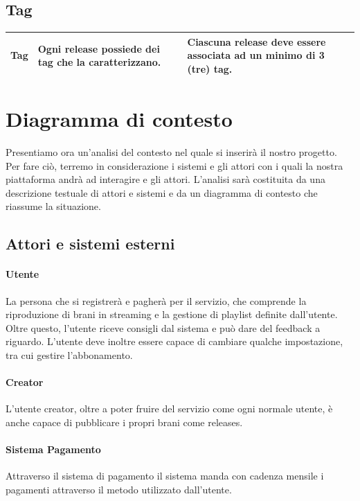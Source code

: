 \documentclass[a4paper,12pt]{article}
\begin{document}
\subsection*{Tag}

{
    \centering
    \begin{tabularx}{\textwidth}{|l|>{\raggedright\arraybackslash}X|>{\raggedright\arraybackslash}X|>{\raggedright\arraybackslash}X|}
    \hline
    Tag & Ogni release possiede dei tag che la caratterizzano. & Ciascuna release deve essere associata ad un minimo di 3 (tre) tag. \\
    \hline
    \end{tabularx} \par
}

\newpage
\section{Diagramma di contesto}

Presentiamo ora un'analisi del contesto nel quale si inserirà il nostro progetto. Per fare ciò, terremo in considerazione i sistemi e gli attori con i quali la nostra piattaforma andrà ad interagire e gli attori. L'analisi sarà costituita da una descrizione testuale di attori e sistemi e da un diagramma di contesto che riassume la situazione.

\subsection{Attori e sistemi esterni}

\paragraph{Utente} La persona che si registrerà e pagherà per il servizio, che comprende la riproduzione di brani in streaming e la gestione di playlist definite dall’utente. Oltre questo, l’utente riceve consigli dal sistema e può dare del feedback a riguardo. L’utente deve inoltre essere capace di cambiare qualche impostazione, tra cui gestire l’abbonamento.

\paragraph{Creator} L’utente creator, oltre a poter fruire del servizio come ogni normale utente, è anche capace di pubblicare i propri brani come releases.

\paragraph{Sistema Pagamento} Attraverso il sistema di pagamento il sistema manda con cadenza mensile i pagamenti attraverso il metodo utilizzato dall’utente.
\end{document}
